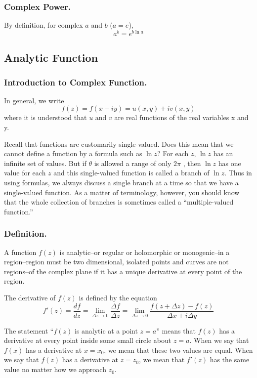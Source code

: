 \documentclass[../main.tex]{subfiles}
\begin{document}
\subsubsection*{Complex Power.} By deﬁnition, for complex $a$ and $b$ ($a = e$),
\begin{equation*}
    a^b=e^{b\ln a}
\end{equation*}

\subsection*{Analytic Function}
\subsubsection*{Introduction to Complex Function.} In general, we write
\begin{equation*}
    f(z) = f(x + iy) = u(x, y) + iv(x, y)
\end{equation*}
where it is understood that $u$ and $v$ are real functions of the real variables x and y. 

Recall that functions are customarily single-valued. Does this mean that we cannot deﬁne a function by a formula such as $\ln z$? For each $z$, $\ln z$ has an inﬁnite set of values. But if $\theta$ is allowed a range of only $2\pi$ , then $\ln z$ has one value for each $z$ and this single-valued function is 
called a branch of $\ln z$. Thus in using formulas, we always discuss a single branch at a time so that we have a single-valued function. As a matter of terminology, however, you should know that the 
whole collection of branches is sometimes called a “multiple-valued function.”

\subsubsection*{Definition.} A function $f(z)$ is analytic--or regular or holomorphic or monogenic--in a region--region must be two dimensional, isolated points and curves are not regions--of the complex plane if it has a unique derivative at every point of the region. 

 The derivative of $f(z)$ is deﬁned by the equation
 \begin{equation*}
    f'(z)=\frac{df}{dz}=\lim_{\Delta z\rightarrow 0}\frac{\Delta f}{\Delta z}=\lim_{\Delta z\rightarrow 0} \frac{f(z + \Delta z) - f(z)}{\Delta x + i\Delta y}
 \end{equation*}

The statement “$f(z)$ is analytic at a point $z = a$” means that $f(z)$ has a derivative at every point inside some small circle about $z = a$. When we say that $f(x)$ has a derivative at $x = x_0$, we mean that these two values are equal. When we say that $f(z)$ has a derivative at $z = z_0$, we mean that $f'(z)$ has the same value no matter how we approach $z_0$. 
\end{document}
